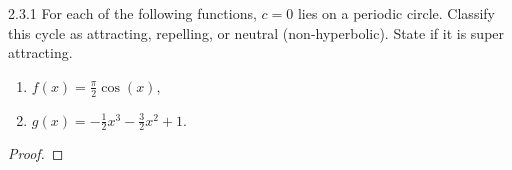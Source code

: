 \begin{problem}{2.3.1}
  For each of the following functions, $c=0$ lies on a periodic circle. Classify
  this cycle as attracting, repelling, or neutral (non-hyperbolic). State if
  it is super attracting.
  \begin{enumerate}
    \item $f(x) = \frac{\pi}{2} \cos(x)$,
    \item $g(x) = -\frac{1}{2}x^3 - \frac{3}{2}x^2 + 1$.
  \end{enumerate}
\end{problem}

\begin{proof}
\end{proof}
\newpage
